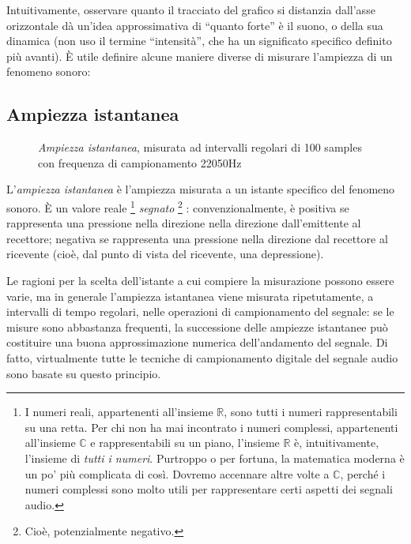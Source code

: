 Intuitivamente, osservare quanto il tracciato del grafico si distanzia dall'asse orizzontale dà un'idea approssimativa di ``quanto forte'' è il suono, o della sua dinamica (non uso il termine ``intensità'', che ha un significato specifico definito più avanti). È utile definire alcune maniere diverse di misurare l'ampiezza di un fenomeno sonoro:

\subsection{Ampiezza istantanea}

\begin{figure}
    \begin{center}
       \scalebox{0.6} {}
    \end{center}
    \caption{\emph{Ampiezza istantanea}, misurata ad intervalli regolari di 100 samples con frequenza di campionamento 22050Hz}
\end{figure}


L'\emph{ampiezza istantanea} è l'ampiezza misurata a un istante specifico del fenomeno sonoro. È un valore reale%
\footnote{I numeri reali, appartenenti all'insieme $\mathbb{R}$, sono tutti i numeri rappresentabili su una retta. Per chi non ha mai incontrato i numeri complessi, appartenenti all'insieme $\mathbb{C}$ e rappresentabili su un piano, l'insieme $\mathbb{R}$ è, intuitivamente, l'insieme di \emph{tutti i numeri}. Purtroppo o per fortuna, la matematica moderna è un po' più complicata di così. Dovremo accennare altre volte a $\mathbb{C}$, perché i numeri complessi sono molto utili per rappresentare certi aspetti dei segnali audio.}
\emph{segnato}%
\footnote{Cioè, potenzialmente negativo.}
: convenzionalmente, è positiva se rappresenta una pressione nella direzione nella direzione dall'emittente al recettore; negativa se rappresenta una pressione nella direzione dal recettore al ricevente (cioè, dal punto di vista del ricevente, una depressione). 

Le ragioni per la scelta dell'istante a cui compiere la misurazione possono essere varie, ma in generale l'ampiezza istantanea viene misurata ripetutamente, a intervalli di tempo regolari, nelle operazioni di campionamento del segnale: se le misure sono abbastanza frequenti, la successione delle ampiezze istantanee può costituire una buona approssimazione numerica dell'andamento del segnale. Di fatto, virtualmente tutte le tecniche di campionamento digitale del segnale audio sono basate su questo principio. 

